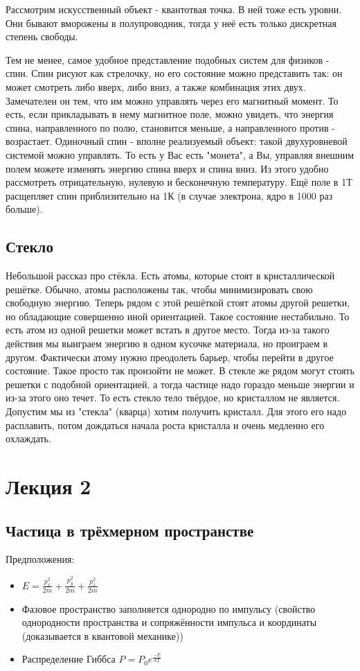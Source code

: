 \documentclass[a4paper, 12pt]{article}
\begin{document}
	Рассмотрим искусственный объект - квантотвая точка. В ней тоже есть уровни. Они бывают вморожены в полупроводник, тогда у неё есть только дискретная степень свободы.
	
	Тем не менее, самое удобное представление подобных систем для физиков - спин. Спин рисуют как стрелочку, но его состояние можно представить так: он может смотреть либо вверх, либо вниз, а также комбинация этих двух. Замечателен он тем, что им можно управлять через его магнитный момент. То есть, если прикладывать в нему магнитное поле, можно увидеть, что энергия спина, направленного по полю, становится меньше, а направленного против - возрастает. Одиночный спин - вполне реализуемый объект: такой двухуровневой системой можно управлять. То есть у Вас есть "монета", а Вы, управляя внешним полем можете изменять энергию спина вверх и спина вниз. Из этого удобно рассмотреть отрицательную, нулевую и бесконечную температуру. Ещё поле в 1Т расщепляет спин приблизительно на 1К (в случае электрона, ядро в 1000 раз больше).
	\subsection{Стекло}
	Небольшой рассказ про стёкла. Есть атомы, которые стоят в кристаллической решётке. Обычно, атомы расположены так, чтобы минимизировать свою свободную энергию. Теперь рядом с этой решёткой стоят атомы другой решетки, но обладающие совершенно иной ориентацией. Такое состояние нестабильно. То есть атом из одной решетки может встать в другое место. Тогда из-за такого действия мы выиграем энергию в одном кусочке материала, но проиграем в другом. Фактически атому нужно преодолеть барьер, чтобы перейти в другое состояние. Такое просто так произойти не может. В стекле же рядом могут стоять решетки с подобной ориентацией, а тогда частице надо гораздо меньше энергии и из-за этого оно течет. То есть стекло тело твёрдое, но кристаллом не является. Допустим мы из "стекла" (кварца) хотим получить кристалл. Для этого его надо расплавить, потом дождаться начала роста кристалла и очень медленно его охлаждать.
	
	\section{Лекция 2}
	\subsection{Частица в трёхмерном пространстве}
	Предположения:
	\begin{itemize}
		\item $E = \frac{p_{x}^2}{2m}+\frac{p_{y}^2}{2m}+\frac{p_{z}^2}{2m}$
		\item Фазовое пространство заполняется однородно по импульсу (свойство однородности пространства и сопряжённости импульса и координаты (доказывается в квантовой механике))
		\item  Распределение Гиббса $P = P_{0} e^{\frac{-E}{kT}}$
	\end{itemize}
	
\end{document}
